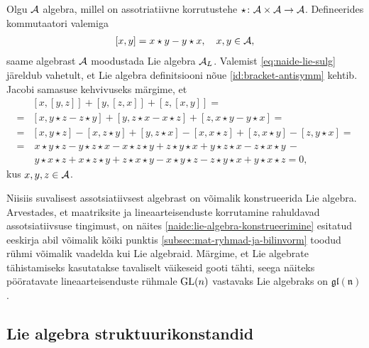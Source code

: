 \begin{naide}\label{naide:lie-algebra-konstrueerimine}
    Olgu $\mathcal{A}$ algebra, millel on assotriatiivne korrutustehe
    $\star \colon \mathcal{A} \times \mathcal{A} \to \mathcal{A}$. Defineerides kommutaatori valemiga
    \begin{align}\label{eq:naide-lie-sulg}
        [x, y] = x \star y - y \star x,\quad x, y \in \mathcal{A},
    \end{align}
    saame algebrast $\mathcal{A}$ moodustada Lie algebra $\mathcal{A}_L$. Valemist
    \eqref{eq:naide-lie-sulg} järeldub vahetult, et Lie algebra
    definitsiooni nõue \eqref{id:bracket-antisymm} kehtib. Jacobi samasuse
    kehvivuseks märgime, et
    \begin{align*}
        &\left[x, \left[y, z\right]\right] + 
            \left[y, \left[z, x\right]\right] + 
            \left[z, \left[x, y\right]\right] = \\
        =& \left[x, y \star z - z \star y \right] + 
            \left[y, z \star x - x \star z \right] + 
            \left[z, x \star y - y \star x \right] = \\
        =& \left[x, y \star z\right] - \left[x, z \star y\right] + 
            \left[y, z \star x\right] - \left[x, x \star z\right] + 
            \left[z, x \star y\right] - \left[z, y \star x\right] = \\
        =&\ x \star y \star z - y \star z \star x - x \star z \star y +
            z \star y \star x + y \star z \star x - z \star x \star y\, - \\
         &\ y \star x \star z + x \star z \star y + z \star x \star y -
            x \star y \star z - z \star y \star x + y \star x \star z = 0,
    \end{align*}
    kus $x, y, z \in \mathcal{A}$.
\end{naide}

Niisiis suvalisest assotsiatiivsest algebrast on võimalik konstrueerida
Lie algebra. Arvestades, et maatriksite ja lineaarteisenduste korrutamine
rahuldavad assotsiatiivsuse tingimust, on näites
\ref{naide:lie-algebra-konstrueerimine} esitatud eeskirja abil
võimalik kõiki punktis \ref{subsec:mat-ryhmad-ja-bilinvorm} toodud
rühmi võimalik vaadelda kui Lie algebraid. Märgime, et Lie algebrate
tähistamiseks kasutatakse tavaliselt väikeseid gooti tähti, seega näiteks
pööratavate lineaarteisenduste rühmale $\operatorname{GL}(n)$ vastavaks Lie algebraks on
$\mathfrak{gl(n)}$.

\subsection{Lie algebra struktuurikonstandid}

